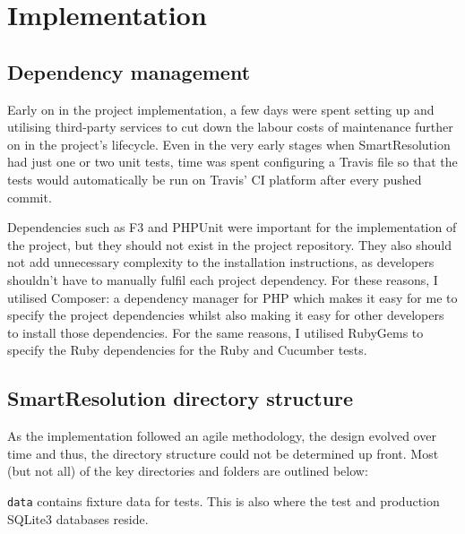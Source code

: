 \chapter{Implementation}

\section{Dependency management}

Early on in the project implementation, a few days were spent setting up and utilising third-party services to cut down the labour costs of maintenance further on in the project's lifecycle. Even in the very early stages when SmartResolution had just one or two unit tests, time was spent configuring a Travis file so that the tests would automatically be run on Travis' CI platform after every pushed commit.

Dependencies such as F3 and PHPUnit were important for the implementation of the project, but they should not exist in the project repository. They also should not add unnecessary complexity to the installation instructions, as developers shouldn't have to manually fulfil each project dependency. For these reasons, I utilised Composer: a dependency manager for PHP which makes it easy for me to specify the project dependencies whilst also making it easy for other developers to install those dependencies. For the same reasons, I utilised RubyGems to specify the Ruby dependencies for the Ruby and Cucumber tests.

\section{SmartResolution directory structure}

As the implementation followed an agile methodology, the design evolved over time and thus, the directory structure could not be determined up front. Most (but not all) of the key directories and folders are outlined below:

\begin{minipage}{\textwidth}
\end{minipage}

\lstinline{data} contains fixture data for tests. This is also where the test and production SQLite3 databases reside.

